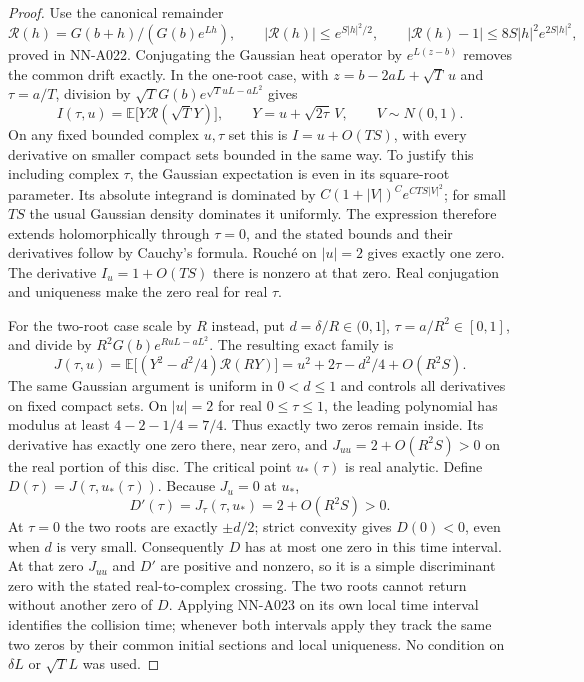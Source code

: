 \begin{proof}
Use the canonical remainder
\[
 \mathcal R(h)=G(b+h)/(G(b)e^{Lh}),\qquad
 |\mathcal R(h)|\le e^{S|h|^2/2},\qquad
 |\mathcal R(h)-1|\le 8S|h|^2e^{2S|h|^2},
\]
proved in NN-A022. Conjugating the Gaussian heat operator by
$e^{L(z-b)}$ removes the common drift exactly. In the one-root
case, with $z=b-2aL+\sqrt T\,u$ and $\tau=a/T$, division by
$\sqrt T G(b)e^{\sqrt T uL-aL^2}$ gives
\[
 I(\tau,u)=\mathbb E\bigl[Y\mathcal R(\sqrt T Y)\bigr],
                    \qquad Y=u+\sqrt{2\tau}\,V,
                    \qquad V\sim N(0,1).
\]
On any fixed bounded complex $u,\tau$ set this is
$I=u+O(TS)$, with every derivative on smaller compact sets
bounded in the same way. To justify this including complex
$\tau$, the Gaussian expectation is even in its square-root
parameter. Its absolute integrand is dominated by
$C(1+|V|)^C e^{C TS|V|^2}$; for small $TS$ the usual Gaussian
density dominates it uniformly. The expression therefore
extends holomorphically through $\tau=0$, and the stated
bounds and their derivatives follow by Cauchy's formula.
Rouch\'e on $|u|=2$ gives exactly one zero. The derivative
$I_u=1+O(TS)$ there is nonzero at that zero. Real conjugation
and uniqueness make the zero real for real $\tau$.

For the two-root case scale by $R$ instead, put
$d=\delta/R\in(0,1]$, $\tau=a/R^2\in[0,1]$, and divide by
$R^2G(b)e^{RuL-aL^2}$. The resulting exact family is
\[
 J(\tau,u)=\mathbb E\bigl[(Y^2-d^2/4)\mathcal R(RY)\bigr]
            =u^2+2\tau-d^2/4+O(R^2S).
\]
The same Gaussian argument is uniform in $0<d\le1$ and
controls all derivatives on fixed compact sets. On $|u|=2$
for real $0\le\tau\le1$, the leading polynomial has modulus
at least $4-2-1/4=7/4$. Thus exactly two zeros remain inside.
Its derivative has exactly one zero there, near zero, and
$J_{uu}=2+O(R^2S)>0$ on the real portion of this disc.
The critical point $u_*(\tau)$ is real analytic. Define
$D(\tau)=J(\tau,u_*(\tau))$. Because $J_u=0$ at $u_*$,
\[
                         D'(\tau)=J_\tau(\tau,u_*)
                                      =2+O(R^2S)>0.
\]
At $\tau=0$ the two roots are exactly $\pm d/2$; strict
convexity gives $D(0)<0$, even when $d$ is very small.
Consequently $D$ has at most one zero in this time interval.
At that zero $J_{uu}$ and $D'$ are positive and nonzero, so
it is a simple discriminant zero with the stated real-to-complex
crossing. The two roots cannot return without another zero of
$D$. Applying NN-A023 on its own local time interval identifies
the collision time; whenever both intervals apply they track
the same two zeros by their common initial sections and local
uniqueness. No condition on $\delta L$ or $\sqrt T L$ was used.
\end{proof}

